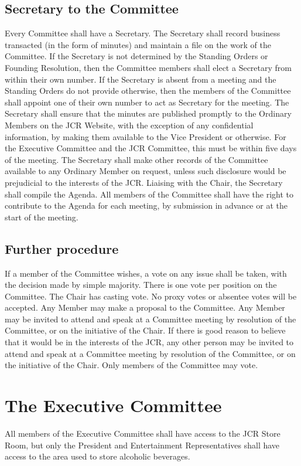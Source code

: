 \subsection{Secretary to the Committee}
\npara Every Committee shall have a Secretary.  The Secretary shall record business transacted (in the form of minutes) and maintain a file on the work of the Committee.
\npara If the Secretary is not determined by the Standing Orders or Founding Resolution, then the Committee members shall elect a Secretary from within their own number.
\npara If the Secretary is absent from a meeting and the Standing Orders do not provide otherwise, then the members of the Committee shall appoint one of their own number to act as Secretary for the meeting.
\npara The Secretary shall ensure that the minutes are published promptly to the Ordinary Members on the JCR Website, with the exception of any confidential information, by making them available to the Vice President or otherwise.
For the Executive Committee and the JCR Committee, this must be within five days of the meeting.
\npara The Secretary shall make other records of the Committee available to any Ordinary Member on request, unless such disclosure would be prejudicial to the interests of the JCR.
\npara Liaising with the Chair, the Secretary shall compile the Agenda.
All members of the Committee shall have the right to contribute to the Agenda for each meeting, by submission in advance or at the start of the meeting.
\subsection{Further procedure}
\npara If a member of the Committee wishes, a vote on any issue shall be taken, with the decision made by simple majority.
There is one vote per position on the Committee.
The Chair has casting vote. No proxy votes or absentee votes will be accepted.
\npara Any Member may make a proposal to the Committee.
\npara Any Member may be invited to attend and speak at a Committee meeting by resolution of the Committee, or on the initiative of the Chair.  If there is good reason to believe that it would be in the interests of the JCR, any other person may be invited to attend and speak at a Committee meeting by resolution of the Committee, or on the initiative of the Chair.
Only members of the Committee may vote.
\section{The Executive Committee}
\npara All members of the Executive Committee shall have access to the JCR Store Room, but only the President and Entertainment Representatives shall have access to the area used to store alcoholic beverages.

